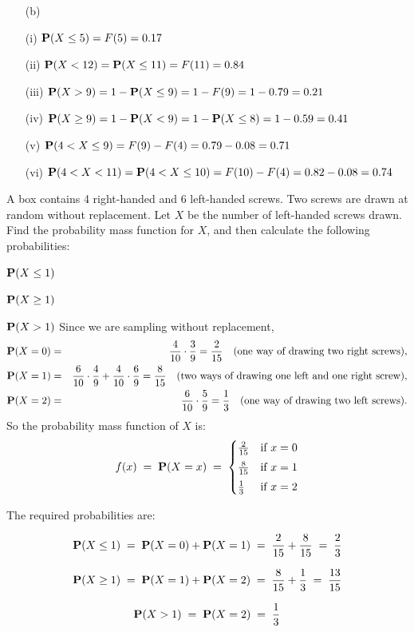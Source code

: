 \begin{ExerciseList}
\begin{itemize}
\medskip
\item[(b)]
\be
\item[(i)]$\mathbf{P}(X\leq 5)= F(5) = 0.17$ \\[3pt]
\item[(ii)]$\mathbf{P}(X<12)=\mathbf{P}(X\leq11) = F(11) =0.84$\\[3pt]
\item[(iii)] $\mathbf{P}(X>9)= 1 - \mathbf{P}(X\leq 9) = 1- F(9) =1-0.79=0.21$ \\[3pt]
\item[(iv)] $\mathbf{P}(X\geq 9)=1-\mathbf{P}(X <  9)=1-\mathbf{P}(X\leq 8)=1-0.59=0.41$ \\[3pt]
\item[(v)] $\mathbf{P}(4 <  X\leq 9)= F(9) - F(4) =0.79-0.08=0.71$ \\[3pt]
\item[(vi)] $\mathbf{P}(4<X<11)=\mathbf{P}(4 <  X\leq 10)= F(10) -F(4) =0.82- 0.08=0.74$ \\[3pt]
\ee
\end{itemize}


\Exercise
A box contains 4 right-handed and 6 left-handed screws.  
Two screws are drawn at random without replacement. Let $X$ be the number of left-handed screws drawn.  
Find the probability mass function for $X$, and then calculate  the following probabilities:
\be
\item $\mathbf{P}(X\leq 1)$
\item $\mathbf{P}(X\geq 1)$
\item $\mathbf{P}(X>1)$
\ee
\Answer
Since  we are sampling without replacement,
\begin{eqnarray*}
\mathbf{P}(X=0) &=& \frac{4}{10}\cdot\frac{3}{9} = \frac{2}{15}\quad (\text{one way of drawing two right screws}), \\
\mathbf{P}(X=1) &=& \frac{6}{10}\cdot\frac{4}{9}+\frac{4}{10}\cdot\frac{6}{9} = \frac{8}{15}\quad(\text{two ways of drawing one left and one  right screw}),\\
\mathbf{P}(X=2) &=& \frac{6}{10}\cdot\frac{5}{9} = \frac{1}{3}\quad(\text{one way of drawing two left screws}).
\end{eqnarray*}
So the probability mass function of $X$ is:
\[f(x)\;=\;\mathbf{P}(X=x)\;=\;
\begin{cases}
\frac{2}{15}  & \text{if } x=0\\[3pt]
\frac{8}{15} & \text{if } x=1\\[3pt]
\frac{1}{3}  & \text{if } x=2
\end{cases}\]

The required probabilities are:
\be
\item
$$\mathbf{P}(X\leq1)\;=\;\mathbf{P}(X=0)+\mathbf{P}(X=1)\;=\;\frac{2}{15}+\frac{8}{15}\;=\;\frac{2}{3}$$
\item
$$\mathbf{P}(X\geq 1)\;=\;\mathbf{P}(X=1)+\mathbf{P}(X=2)\;=\;\frac{8}{15}+\frac{1}{3}\;=\;\frac{13}{15}$$
\item
$$\mathbf{P}(X>1)\;=\;\mathbf{P}(X=2)\;=\;\frac{1}{3}$$
\ee


\end{ExerciseList}
